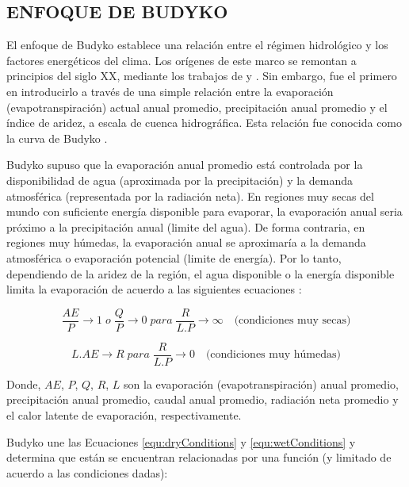 \documentclass[12pt]{article}
\begin{document}
\subsection{ENFOQUE DE BUDYKO}

El enfoque de Budyko establece una relación entre el régimen hidrológico y los factores energéticos del clima. Los orígenes de este marco se remontan a principios del siglo XX, mediante los trabajos de \citet{schreiber1904relationship} y \citet{ol1911evaporation}. Sin embargo, \citet{budyko1958heat} fue el primero en introducirlo a través de una simple relación entre la evaporación (evapotranspiración) actual anual promedio, precipitación anual promedio y el índice de aridez, a escala de cuenca hidrográfica. Esta relación fue conocida como la curva de Budyko \citep{budyko1958heat}.

Budyko supuso que la evaporación anual promedio está controlada por la disponibilidad de agua (aproximada por la precipitación) y la demanda atmosférica (representada por la radiación neta). En regiones muy secas del mundo con suficiente energía disponible para evaporar, la evaporación anual seria próximo a la precipitación anual (limite del agua). De forma contraria, en regiones muy húmedas, la evaporación anual se aproximaría a la demanda atmosférica o evaporación potencial (limite de energía). Por lo tanto, dependiendo de la aridez de la región, el agua disponible o la energía disponible limita la evaporación de acuerdo a las siguientes ecuaciones \citep{budyko1958heat}:

\begin{equation}
 \frac{AE}{P} \rightarrow 1 \; o \; \frac{Q}{P} \rightarrow 0 \;para\; \frac{R}{L.P} \rightarrow \infty \quad \text{(condiciones muy secas)}
\label{equ:dryConditions}
\end{equation}

\begin{equation}
L.AE \rightarrow R \;para\; \frac{R}{L.P} \rightarrow 0 \quad \text{(condiciones muy húmedas)}
\label{equ:wetConditions}
\end{equation}

Donde, $AE$, $P$, $Q$, $R$, $L$ son la evaporación (evapotranspiración) anual promedio, precipitación anual promedio, caudal anual promedio, radiación neta promedio y el calor latente de evaporación, respectivamente.

\clearpage
Budyko une las Ecuaciones \ref{equ:dryConditions} y \ref{equ:wetConditions} y determina que están se encuentran relacionadas por una función (y limitado de acuerdo a las condiciones dadas):
\end{document}

